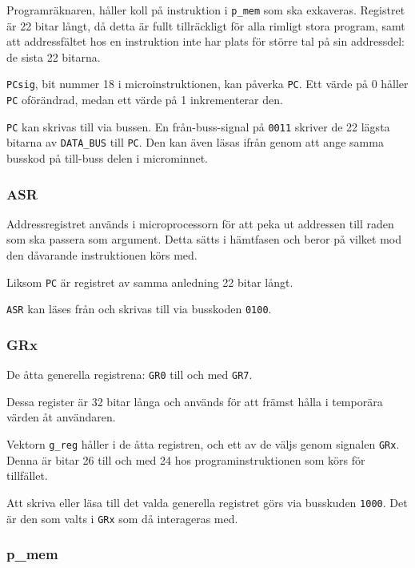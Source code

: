 \documentclass[]{article}
\begin{document}
Programräknaren, håller koll på instruktion i \texttt{p\_mem} som ska exkaveras. Registret är 22 bitar långt, då detta är fullt tillräckligt för alla rimligt stora program, samt att addressfältet hos en instruktion inte har plats för större tal på sin addressdel: de sista 22 bitarna.

\texttt{PCsig}, bit nummer 18 i microinstruktionen, kan påverka \texttt{PC}. Ett värde på 0 håller \texttt{PC} oförändrad, medan ett värde på 1 inkrementerar den.

\texttt{PC} kan skrivas till via bussen. En från-buss-signal på \texttt{0011} skriver de 22 lägsta bitarna av \texttt{DATA\_BUS} till \texttt{PC}. Den kan även läsas ifrån genom att ange samma busskod på till-buss delen i microminnet.

\newpage
\subsubsection{ASR}

Addressregistret används i microprocessorn för att peka ut addressen till raden som ska passera som argument. Detta sätts i hämtfasen och beror på vilket mod den dåvarande instruktionen körs med.

Liksom \texttt{PC} är registret av samma anledning 22 bitar långt.

\texttt{ASR} kan läses från och skrivas till via busskoden \texttt{0100}.

\subsubsection{GRx}

De åtta generella registrena: \texttt{GR0} till och med \texttt{GR7}.

Dessa register är 32 bitar långa och används för att främst hålla i temporära värden åt användaren.

Vektorn \texttt{g\_reg} håller i de åtta registren, och ett av de väljs genom signalen \texttt{GRx}. Denna är bitar 26 till och med 24 hos programinstruktionen som körs för tillfället.

Att skriva eller läsa till det valda generella registret görs via busskuden \texttt{1000}. Det är den som valts i \texttt{GRx} som då interageras med. 

\subsubsection{p\_mem}
\end{document}
